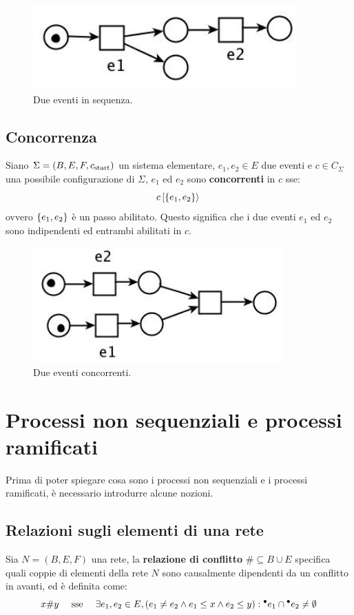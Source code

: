 \begin{figure}
    \centering
    \includegraphics[width=0.5\linewidth]{img/sequenza.png}
    \caption{Due eventi in sequenza.}
    \label{fig:eventi_sequenza}
\end{figure}

\subsection{Concorrenza}
Siano $\Sigma = (B, E, F, c_{\textnormal{start}})$ un sistema elementare, $e_1, e_2 \in E$ due eventi e $c \in C_{\Sigma}$ una possibile configurazione di $\Sigma$, $e_1$ ed $e_2$ sono \textbf{concorrenti} in $c$ sse:
\[
    c\,[\left\{e_1, e_2\right\}\rangle\,
\]
ovvero $\left\{e_1, e_2\right\}$ è un passo abilitato. Questo significa che i due eventi $e_1$ ed $e_2$ sono indipendenti ed entrambi abilitati in $c$.

\begin{figure}
    \centering
    \includegraphics[width=0.5\linewidth]{img/eventi_concorrenti.png}
    \caption{Due eventi concorrenti.}
    \label{fig:eventi_concorrenti}
\end{figure}

\section{Processi non sequenziali e processi ramificati}
Prima di poter spiegare cosa sono i processi non sequenziali e i processi ramificati, è necessario introdurre alcune nozioni.

\subsection{Relazioni sugli elementi di una rete}

\begin{defn}
    Sia $N = (B, E, F)$ una rete, la \textbf{relazione di conflitto} $\# \subseteq B \cup E$ specifica quali coppie di elementi della rete $N$ sono causalmente dipendenti da un conflitto in avanti, ed è definita come:
    \[
        x \# y \quad \textnormal{ sse } \quad \exists e_1, e_2 \in E, (e_1 \neq e_2 \land e_1 \le x \land e_2 \le y) : {^\bullet}e_1 \cap {^\bullet}e_2 \neq \emptyset
    \]
\end{defn}

